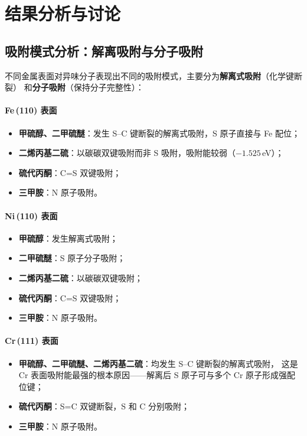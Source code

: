 \documentclass[12pt, a4paper]{article}
\begin{document}
\section{结果分析与讨论}

\subsection{吸附模式分析：解离吸附与分子吸附}

不同金属表面对异味分子表现出不同的吸附模式，主要分为\textbf{解离式吸附}（化学键断裂）
和\textbf{分子吸附}（保持分子完整性）：

\paragraph{Fe\,(110) 表面}
\begin{itemize}[leftmargin=2em]
  \item \textbf{甲硫醇、二甲硫醚}：发生 S--C 键断裂的解离式吸附，S 原子直接与 Fe 配位；
  \item \textbf{二烯丙基二硫}：以碳碳双键吸附而非 S 吸附，吸附能较弱（$-1.525$\,eV）；
  \item \textbf{硫代丙酮}：C=S 双键吸附；
  \item \textbf{三甲胺}：N 原子吸附。
\end{itemize}

\paragraph{Ni\,(110) 表面}
\begin{itemize}[leftmargin=2em]
  \item \textbf{甲硫醇}：发生解离式吸附；
  \item \textbf{二甲硫醚}：S 原子分子吸附；
  \item \textbf{二烯丙基二硫}：以碳碳双键吸附；
  \item \textbf{硫代丙酮}：C=S 双键吸附；
  \item \textbf{三甲胺}：N 原子吸附。
\end{itemize}

\paragraph{Cr\,(111) 表面}
\begin{itemize}[leftmargin=2em]
  \item \textbf{甲硫醇、二甲硫醚、二烯丙基二硫}：均发生 S--C 键断裂的解离式吸附，
        这是 Cr 表面吸附能最强的根本原因——解离后 S 原子可与多个 Cr 原子形成强配位键；
  \item \textbf{硫代丙酮}：S=C 双键断裂，S 和 C 分别吸附；
  \item \textbf{三甲胺}：N 原子吸附。
\end{itemize}
\end{document}

